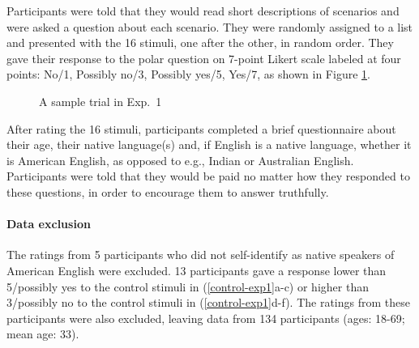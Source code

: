 \documentclass[11pt,fleqn]{article}
\newcommand{\6}{\mbox{$[\hspace*{-.6mm}[$}}
\newcommand{\9}{\mbox{$]\hspace*{-.6mm}]$}}
\begin{document}
Participants were told that they would read short descriptions of scenarios and were asked a question about each scenario. They were randomly assigned to a list and presented with the 16 stimuli, one after the other, in random order. They gave their response to the polar question on 7-point Likert scale labeled at four points: No/1, Possibly
no/3, Possibly yes/5, Yes/7, as shown in Figure \ref{f-trial-exp1}. 

\begin{figure}[h!]
\centering


\caption{A sample trial in Exp.~1}\label{f-trial-exp1}
\end{figure}

After rating the 16 stimuli, participants completed a brief questionnaire about their age, their
native language(s) and, if English is a native language, whether it is
American English, as opposed to e.g., Indian or Australian English.
Participants were told that they would be paid no matter how they
responded to these questions, in order to encourage them to answer
truthfully.


\paragraph{Data exclusion} The ratings from 5 participants who did not self-identify as native speakers of American English were excluded. 13 participants gave a response lower than 5/possibly yes to the control stimuli in (\ref{control-exp1}a-c) or higher than 3/possibly no to the control stimuli in (\ref{control-exp1}d-f). The ratings from these participants were also excluded, leaving data from 134 participants (ages: 18-69; mean age: 33).
\end{document}
